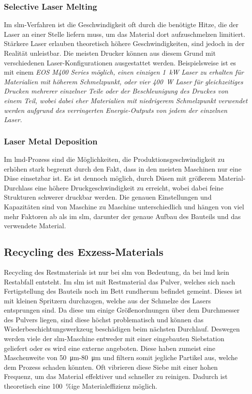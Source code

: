 \documentclass[../main.tex]{subfiles}
\begin{document}
\subsubsection*{Selective Laser Melting}
Im \acrshort{slm}-Verfahren ist die Geschwindigkeit oft durch die benötigte Hitze, die der Laser an einer Stelle liefern muss, um das Material dort aufzuschmelzen limitiert. Stärkere Laser erlauben theoretisch höhere Geschwindigkeiten, sind jedoch in der Realität unleistbar. Die meisten Drucker können aus diesem Grund mit verschiedenen Laser-Konfigurationen ausgestattet werden. Beispielsweise ist es mit einem \it{EOS M400 Series} möglich, einen einzigen \qty{1}{\kilo\watt} Laser zu erhalten für Materialien mit höherem Schmelzpunkt, oder vier \qty{400}{\watt} Laser für gleichzeitiges Drucken mehrerer einzelner Teile oder der Beschleunigung des Druckes von einem Teil, wobei dabei eher Materialien mit niedrigerem Schmelzpunkt verwendet werden aufgrund des verringerten Energie-Outputs von jedem der einzelnen Laser.\parencite{eosm400,eosm400_4}
\subsubsection*{Laser Metal Deposition}
Im \acrlong{lmd}-Prozess sind die Möglichkeiten, die Produktionsgeschwindigkeit zu erhöhen stark begrenzt durch den Fakt, dass in den meisten Maschinen nur eine Düse einsetzbar ist. Es ist dennoch möglich, durch Düsen mit größerem Material-Durchlass eine höhere Druckgeschwindigkeit zu erreicht, wobei dabei feine Strukturen schwerer druckbar werden. Die genauen Einstellungen und Kapazitäten sind von Maschine zu Maschine unterschiedlich und hängen von viel mehr Faktoren ab als im \acrlong{slm}, darunter der genaue Aufbau des Bauteils und das verwendete Material. \parencite{Mahamood2017}
\subsection{Recycling des Exzess-Materials}
Recycling des Restmaterials ist nur bei \acrshort{slm} von Bedeutung, da bei \acrshort{lmd} kein Restabfall entsteht. Im \acrshort{slm} ist mit Restmaterial das Pulver, welches sich nach Fertigstellung des Bauteils noch im Bett rundherum befindet gemeint. Dieses ist mit kleinen Spritzern durchzogen, welche aus der Schmelze des Lasers entsprungen sind. Da diese um einige Größenordnungen über dem Durchmesser des Pulvers liegen, sind diese höchst problematisch und können das Wiederbeschichtungswerkzeug beschädigen beim nächsten Durchlauf. Deswegen werden viele der \acrshort{slm}-Maschine entweder mit einer eingebauten Siebstation geliefert oder es wird eine externe angeboten. Diese haben zumeist eine Maschenweite von \qty{50}{\micro\meter}-\qty{80}{\micro\meter} und filtern somit jegliche Partikel aus, welche dem Prozess schaden könnten. Oft vibrieren diese Siebe mit einer hohen Frequenz, um das Material effektiver und schneller zu reinigen. Dadurch ist theoretisch eine \qty{100}{\percent}ige Materialeffizienz möglich. 
\end{document}
